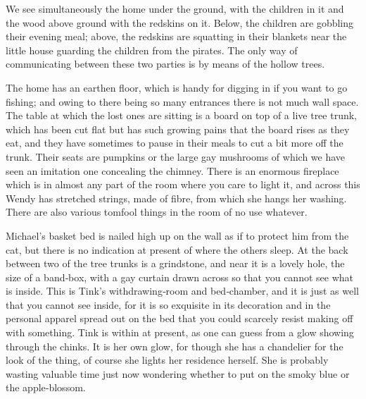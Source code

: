 

\begin{Settings}
We see simultaneously the home under the ground, with the children in it
and the wood above ground with the redskins on it.
Below, the children are gobbling their evening meal;
above, the redskins are squatting in their blankets near the little house guarding the children from the pirates.
The only way of communicating between these two parties is by means of the hollow trees.

The home has an earthen floor, which is handy for digging in if you want to go fishing;
and owing to there being so many entrances there is not much wall space.
The table at which the lost ones are sitting is a board on top of a live tree trunk,
which has been cut flat but has such growing pains that the board rises as they eat,
and they have sometimes to pause in their meals to cut a bit more off the trunk.
Their seats are pumpkins or the large gay mushrooms of which we have seen an imitation one concealing the chimney.
There is an enormous fireplace which is in almost any part of the room where you care to light it,
and across this Wendy has stretched strings, made of fibre, from which she hangs her washing.
There are also various tomfool things in the room of no use whatever.

Michael’s basket bed is nailed high up on the wall as if to protect him from the cat,
but there is no indication at present of where the others sleep.
At the back between two of the tree trunks is a grindstone,
and near it is a lovely hole, the size of a band‐box,
with a gay curtain drawn across so that you cannot see what is inside.
This is Tink’s withdrawing‐room and bed‐chamber, and it is just as well that you cannot see inside,
for it is so exquisite in its decoration and in the personal apparel spread out on the bed
that you could scarcely resist making off with something.
Tink is within at present, as one can guess from a glow showing through the chinks.
It is her own glow, for though she has a chandelier for the look of the thing, of course she lights her residence herself.
She is probably wasting valuable time just now wondering whether to put on the smoky blue or the apple‐blossom.


\end{Settings}
